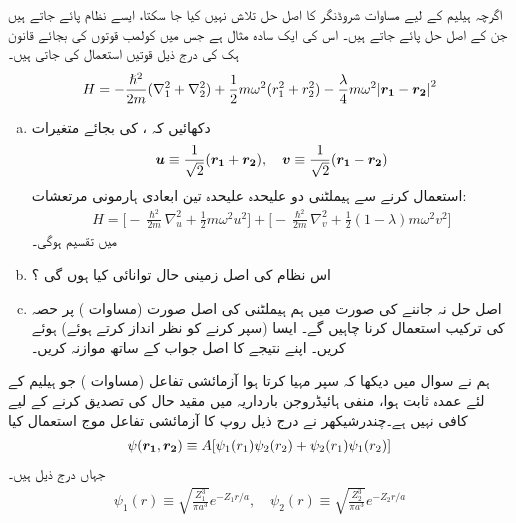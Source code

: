 اگرچہ ہیلیم کے لیے مساوات شروڈنگر کا اصل حل تلاش نہیں کیا جا سکتا، ایسے  نظام پائے جاتے ہیں جن کے اصل حل پائے جاتے ہیں۔ اس کی ایک سادہ مثال ہے جس میں کولمب قوتوں کی بجائے قانون ہک کی درج ذیل قوتیں استعمال کی جاتی ہیں۔
\begin{align}\label{مساوات_تغیریت_اصل_ہیملٹنی_ربڑی}
H=-\frac{\hslash^{2}}{2m}(\nabla_{1}^{2}+\nabla_{2}^{2})+\frac{1}{2}m\omega^{2}(r_{1}^{2}+r_{2}^{2})-\frac{\lambda}{4}m\omega^{2}\abs{{{\boldsymbol{r_{1}}}}-{{\boldsymbol{r_{2}}}}}^{2} 
\end{align}
\begin{enumerate}[a.]
\item
 دکھائیں کہ ،  کی بجائے متغیرات
\begin{align}
{\ensuremath{{\boldsymbol{u}}}}\equiv\frac{1}{\sqrt{2}}({{\boldsymbol{r_{1}}}}+{{\boldsymbol{r_{2}}}}), \quad {\ensuremath{{\boldsymbol{v}}}}\equiv\frac{1}{\sqrt{2}}({{\boldsymbol{r_{1}}}}-{{\boldsymbol{r_{2}}}})
\end{align}
 استعمال کرنے سے ہیملٹنی دو علیحدہ علیحدہ تین ابعادی ہارمونی مرتعشات:
\begin{align}
H=\Big[-\frac{\hslash^{2}}{2m}\nabla_{u}^{2}+\frac{1}{2}m\omega^{2}u^{2}\Big]+\Big[-\frac{\hslash^{2}}{2m}\nabla_{v}^{2}+\frac{1}{2}(1-\lambda)m\omega^{2}v^{2}\Big]
\end{align}
 میں تقسیم ہوگی۔
\item
 اس نظام کی اصل زمینی حال توانائی کیا ہوں گی ؟
\item
 اصل حل نہ جاننے کی صورت میں ہم ہیملٹنی کی اصل صورت (مساوات ) پر حصہ  کی ترکیب استعمال کرنا چاہیں گے۔
ایسا (سپر کرنے کو نظر انداز کرتے ہوئے) ہوئے کریں۔ اپنے نتیجے کا اصل جواب کے ساتھ موازنہ کریں۔  
\end{enumerate}
ہم نے سوال  میں دیکھا کہ سپر مہیا کرتا ہوا آزمائشی تفاعل (مساوات  ) جو ہیلیم کے لئے عمدہ ثابت ہوا، منفی ہائیڈروجن بارداریہ میں مقید حال کی تصدیق کرنے کے لیے کافی نہیں ہے۔چندرشیکھر نے درج ذیل روپ کا آزمائشی تفاعل موج استعمال کیا
\begin{align}
\psi({{\boldsymbol{r_{1}}}},{{\boldsymbol{r_{2}}}})\equiv A[\psi_{1}(r_{1})\psi_{2}(r_{2})+\psi_{2}(r_{1})\psi_{1}(r_{2})]
\end{align}
 جہاں درج ذیل ہیں۔
\begin{align}
\psi_{1}(r)\equiv \sqrt{\frac{Z_{1}^{3}}{\pi a^{3}}}e^{-Z_{1}r/a}, \quad \psi_{2}(r)\equiv \sqrt{\frac{Z_{2}^{3}}{\pi a^{3}}}e^{-Z_{2}r/a} 
\end{align}
 

